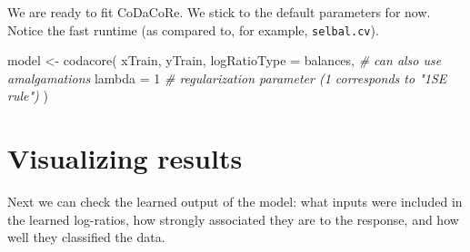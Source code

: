 \documentclass[
]{article}
\newenvironment{Shaded}{\begin{snugshade}}{\end{snugshade}}
\newcommand{\AttributeTok}[1]{\textcolor[rgb]{0.77,0.63,0.00}{#1}}
\newcommand{\CommentTok}[1]{\textcolor[rgb]{0.56,0.35,0.01}{\textit{#1}}}
\newcommand{\DecValTok}[1]{\textcolor[rgb]{0.00,0.00,0.81}{#1}}
\newcommand{\FloatTok}[1]{\textcolor[rgb]{0.00,0.00,0.81}{#1}}
\newcommand{\FunctionTok}[1]{\textcolor[rgb]{0.00,0.00,0.00}{#1}}
\newcommand{\NormalTok}[1]{#1}
\newcommand{\OtherTok}[1]{\textcolor[rgb]{0.56,0.35,0.01}{#1}}
\newcommand{\SpecialCharTok}[1]{\textcolor[rgb]{0.00,0.00,0.00}{#1}}
\newcommand{\StringTok}[1]{\textcolor[rgb]{0.31,0.60,0.02}{#1}}
\begin{document}
\begin{Shaded}
\end{Shaded}

We are ready to fit CoDaCoRe. We stick to the default parameters for
now. Notice the fast runtime (as compared to, for example,
\texttt{selbal.cv}).

\begin{Shaded}
\begin{Highlighting}[]
\NormalTok{model }\OtherTok{\textless{}{-}} \FunctionTok{codacore}\NormalTok{(}
\NormalTok{  xTrain,}
\NormalTok{  yTrain,}
  \AttributeTok{logRatioType =} \StringTok{\textquotesingle{}balances\textquotesingle{}}\NormalTok{, }\CommentTok{\# can also use \textquotesingle{}amalgamations\textquotesingle{}}
  \AttributeTok{lambda =} \DecValTok{1}                 \CommentTok{\# regularization parameter (1 corresponds to "1SE rule")}
\NormalTok{)}
\end{Highlighting}
\end{Shaded}

\hypertarget{visualizing-results}{%
\section{Visualizing results}\label{visualizing-results}}

Next we can check the learned output of the model: what inputs were
included in the learned log-ratios, how strongly associated they are to
the response, and how well they classified the data.
\end{document}
